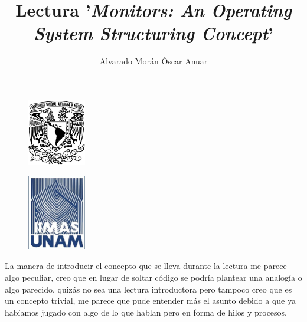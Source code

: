 \documentclass[twocolumn, letterpaper,aps,pra,10pt]{revtex4-1}
\begin{document}
\renewcommand{\figurename}{{\bf Figura }}
\renewcommand{\tablename}{{\bf Tabla}}
\renewcommand{\thesection}{\arabic{section}}
\renewcommand{\thesubsection}{\arabic{subsection}}

\begin{figure}
\flushleft \includegraphics[width=1in]{unam_logo.jpg}
\end{figure}
\begin{figure}
\flushright \includegraphics[width=1in]{iimas.jpg}
\end{figure}

\lhead{}
\rhead{}
\cfoot{\thepage}
\rfoot{}

\vspace*{-1cm}
\title{Lectura '\textit{Monitors: An Operating System Structuring Concept}'}
\author{Alvarado Morán Óscar Anuar}

\maketitle
La manera de introducir el concepto que se lleva durante la lectura me parece algo peculiar, creo que en lugar de soltar código se podría plantear una analogía o algo parecido, quizás no sea una lectura introductora pero tampoco creo que es un concepto trivial, me parece que pude entender más el asunto debido a que ya habíamos jugado con algo de lo que hablan pero en forma de hilos y procesos.
\end{document}
